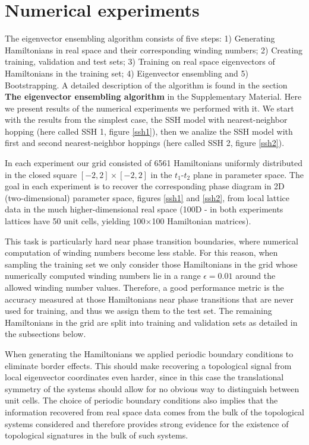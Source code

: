 \documentclass[10pt]{revtex4-1}
\begin{document}
\section*{Numerical experiments}

The eigenvector ensembling algorithm consists of five steps: 1) Generating Hamiltonians in real space and their corresponding winding numbers; 2) Creating training, validation and test sets; 3) Training on real space eigenvectors of Hamiltonians in the training set; 4) Eigenvector ensembling and 5) Bootstrapping. A detailed description of the algorithm is found in the section \textbf{The eigenvector ensembling algorithm} in the Supplementary Material. Here we present results of the numerical experiments we performed with it. We start with the results from the simplest case, the SSH model with nearest-neighbor hopping (here called SSH 1, figure \ref{ssh1}), then we analize the SSH model with first and second nearest-neighbor hoppings (here called SSH 2, figure \ref{ssh2}).

In each experiment our grid consisted of 6561 Hamiltonians uniformly distributed in the closed square $[-2,2]\times[-2,2]$ in the $t_1$-$t_2$ plane in parameter space. The goal in each experiment is to recover the corresponding phase diagram in 2D (two-dimensional) parameter space, figures \ref{ssh1} and \ref{ssh2}, from local lattice data in the much higher-dimensional real space (100D - in both experiments lattices have 50 unit cells, yielding 100$\times$100 Hamiltonian matrices).

This task is particularly hard near phase transition boundaries, where numerical computation of winding numbers become less stable. For this reason, when sampling the training set we only consider those Hamiltonians in the grid whose numerically computed winding numbers lie in a range $\epsilon = 0.01$ around the allowed winding number values. Therefore, a good performance metric is the accuracy measured at those Hamiltonians near phase transitions that are never used for training, and thus we assign them to the test set. The remaining Hamiltonians in the grid are split into training and validation sets as detailed in the subsections below.

When generating the Hamiltonians we applied periodic boundary conditions to eliminate border effects. This should make recovering a topological signal from local eigenvector coordinates even harder, since in this case the translational symmetry of the systems should allow for no obvious way to distinguish between unit cells. The choice of periodic boundary conditions also implies that the information recovered from real space data comes from the bulk of the topological systems considered and therefore provides strong evidence for the existence of topological signatures in the bulk of such systems. 
\end{document}
